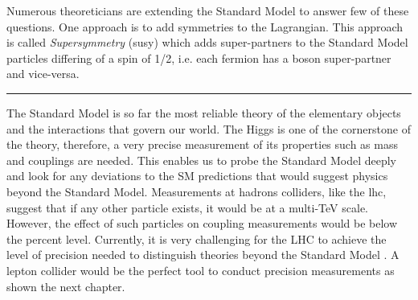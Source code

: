 Numerous theoreticians are extending the Standard Model to answer few of these questions. One approach is to add symmetries to the Lagrangian. This approach is called \textit{Supersymmetry} (\acrshort{susy}) which adds super-partners to the Standard Model particles differing of a spin of 1/2, i.e. each fermion has a boson super-partner and vice-versa.

\begin{center}
  \rule{0.5\textwidth}{.4pt}
\end{center}

The Standard Model is so far the most reliable theory of the elementary objects and the interactions that govern our world. The Higgs is one of the cornerstone of the theory, therefore, a very precise measurement of its properties such as mass and couplings are needed. This enables us to probe the Standard Model deeply and look for any deviations to the SM predictions that would suggest physics beyond the Standard Model. Measurements at hadrons colliders, like the \acrlong{lhc}, suggest that if any other particle exists, it would be at a multi-TeV scale. However, the effect of such particles on coupling measurements would be below the percent level. Currently, it is very challenging for the LHC to achieve the level of precision needed to distinguish theories beyond the Standard Model \cite{CMS:2013xfa}. A lepton collider would be the perfect tool to conduct precision measurements as shown the next chapter.
